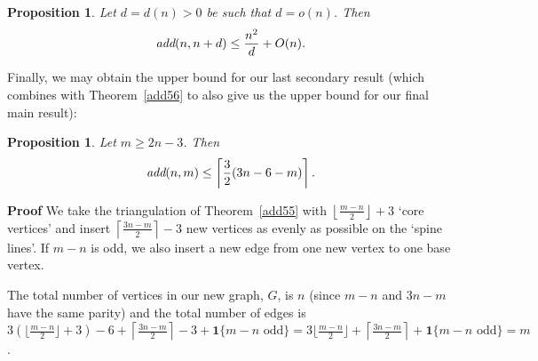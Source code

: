 \documentclass{article}
\newtheorem{Proposition}[Theorem]{Proposition}
\newtheorem{Proof of Theorem}{Proof of Theorem}
\begin{document}
\begin{Proposition} \label{add22}
Let $d=d(n)>0$ be such that $d=o(n)$.
Then
\begin{displaymath}
\emph{add}(n,n +d) \leq \frac{n^{2}}{d}+O(n). 
\end{displaymath}
\end{Proposition} 















Finally,
we may obtain the upper bound for our last secondary result
(which combines with Theorem~\ref{add56} to also give us the upper bound for our final main result):















\begin{Proposition} \label{add713}
Let $m \geq 2n-3$.
Then 
\begin{displaymath}
\emph{add}(n,m) \leq \left \lceil \frac{3}{2} (3n-6-m) \right \rceil.
\end{displaymath}
\end{Proposition}
\textbf{Proof}
We take the triangulation of Theorem~\ref{add55} with 
$\left \lfloor \frac{m-n}{2} \right \rfloor + 3$ `core vertices'
and insert $\left \lceil \frac{3n-m}{2} \right \rceil - 3$ new vertices
as evenly as possible on the `spine lines'.
If $m-n$ is odd,
we also insert a new edge from one new vertex to one base vertex.

The total number of vertices in our new graph, $G$,
is $n$ (since $m-n$ and $3n-m$ have the same parity)
and the total number of edges is
$3 \left( \lfloor \frac{m-n}{2} \rfloor + 3 \right) - 6
+ \left \lceil \frac{3n-m}{2} \right \rceil - 3 + \mathbf{1} \{m-n \textrm{ odd} \}
= 3 \lfloor \frac{m-n}{2} \rfloor + \left \lceil \frac{3n-m}{2} \right \rceil + \mathbf{1} \{m-n \textrm{ odd} \} = m$.
\end{document}
